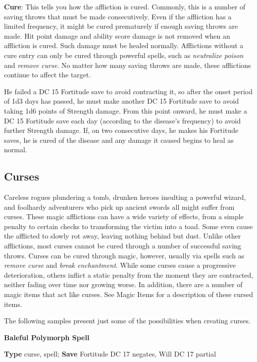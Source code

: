 \textbf{Cure}: This tells you how the affliction is cured. Commonly, this is a number of saving throws that must be made consecutively. Even if the affliction has a limited frequency, it might be cured prematurely if enough saving throws are made. Hit point damage and ability score damage is not removed when an affliction is cured. Such damage must be healed normally. Afflictions without a cure entry can only be cured through powerful spells, such as \textit{neutralize poison} and \textit{remove curse}. No matter how many saving throws are made, these afflictions continue to affect the target. 
				
 He failed a DC 15 Fortitude save to avoid contracting it, so after the onset period of 1d3 days has passed, he must make another DC 15 Fortitude save to avoid taking 1d6 points of Strength damage. From this point onward, he must make a DC 15 Fortitude save each day (according to the disease's frequency) to avoid further Strength damage. If, on two consecutive days, he makes his Fortitude saves, he is cured of the disease and any damage it caused begins to heal as normal.
								
\subsection{Curses}

				
Careless rogues plundering a tomb, drunken heroes insulting a powerful wizard, and foolhardy adventurers who pick up ancient swords all might suffer from curses. These magic afflictions can have a wide variety of effects, from a simple penalty to certain checks to transforming the victim into a toad. Some even cause the afflicted to slowly rot away, leaving nothing behind but dust. Unlike other afflictions, most curses cannot be cured through a number of successful saving throws. Curses can be cured through magic, however, usually via spells such as \textit{remove curse} and \textit{break enchantment}. While some curses cause a progressive deterioration, others inflict a static penalty from the moment they are contracted, neither fading over time nor growing worse. In addition, there are a number of magic items that act like curses. See Magic Items for a description of these cursed items.
				
The following samples present just some of the possibilities when creating curses.
				
\textbf{Baleful Polymorph Spell }
				
\textbf{Type} curse, spell; \textbf{Save} Fortitude DC 17 negates, Will DC 17 partial
				
